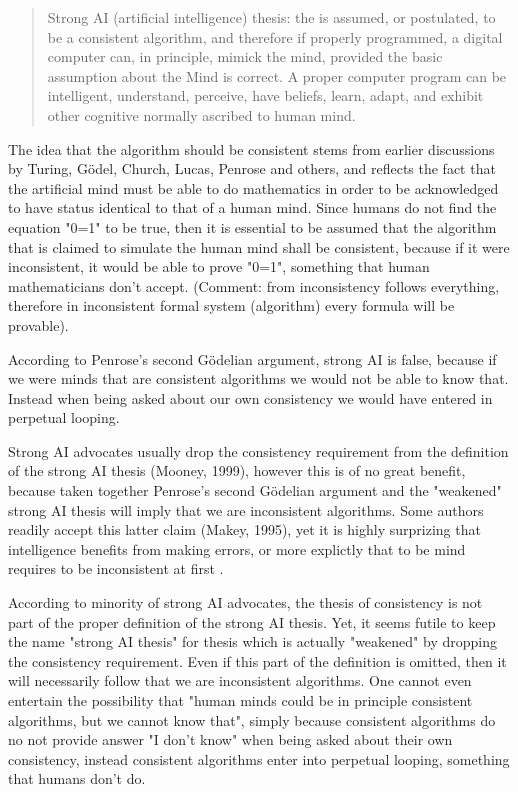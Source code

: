 \documentclass[12pt]{article}
\begin{document}
\begin{verse}Strong AI (artificial intelligence) thesis: the  is assumed, or postulated, to be a consistent algorithm, and therefore if properly programmed, a digital computer can, in principle, mimick the mind, provided the basic assumption about the Mind is correct. A proper computer program can be intelligent, understand, perceive, have beliefs, learn, adapt, and exhibit other cognitive  normally ascribed to human mind.
\end{verse}

The idea that the algorithm should be consistent stems from earlier discussions by Turing, G\"odel, Church, Lucas, Penrose and others, and reflects the fact that the artificial mind must be able to do mathematics in order to be acknowledged to have status identical to that of a human mind. Since humans do not find the equation "0=1" to be true, then it is essential to be assumed that the algorithm that is claimed to simulate the human mind shall be consistent, because if it were inconsistent, it would be able to prove "0=1", something that human mathematicians don't accept. (Comment: from inconsistency follows everything, therefore in inconsistent formal system (algorithm) every formula will be provable).

According to Penrose's second G\"odelian argument, strong AI is false, because if we were minds that are consistent algorithms we would not be able to know that. Instead when being asked about our own consistency we would have entered in perpetual looping.

Strong AI advocates usually drop the consistency requirement from the definition of the strong AI thesis (Mooney, 1999), however this is of no great benefit, because taken together Penrose's second G\"odelian argument and the "weakened" strong AI thesis will imply that we are inconsistent algorithms. Some authors readily accept this latter claim (Makey, 1995), yet it is highly surprizing that intelligence benefits from making errors, or more explictly that to be mind requires to be inconsistent at first .

According to minority of strong AI advocates, the thesis of consistency is not part of the proper definition of the strong AI thesis. Yet, it seems futile to keep the name "strong AI thesis" for thesis which is actually "weakened" by dropping the consistency requirement. Even if this part of the definition is omitted, then it will necessarily follow that we are inconsistent algorithms. One cannot even entertain the possibility that "human minds could be in principle consistent algorithms, but we cannot know that", simply because consistent algorithms do no not provide answer "I don't know" when being asked about their own consistency, instead consistent algorithms enter into perpetual looping, something that humans don't do.
\end{document}
